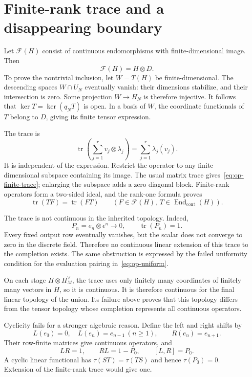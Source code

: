 \section{Finite-rank trace and a disappearing boundary}

Let $\mathcal F(H)$ consist of continuous endomorphisms with
finite-dimensional image. Then
\[
 \mathcal F(H)=H\otimes D.
\]
To prove the nontrivial inclusion, let $W=T(H)$ be finite-dimensional.
The descending spaces $W\cap U_N$ eventually vanish: their dimensions
stabilize, and their intersection is zero. Some projection $W\to H_N$
is therefore injective. It follows that
$\ker T=\ker(q_NT)$ is open. In a basis of $W$, the coordinate
functionals of $T$ belong to $D$, giving its finite tensor expression.

The trace is
\begin{equation}
 \operatorname{tr}\!\left(\sum_{j=1}^r v_j\otimes\lambda_j\right)
       =\sum_{j=1}^r\lambda_j(v_j).
 \label{eq:op-finite-trace}
\end{equation}
It is independent of the expression. Restrict the operator to any
finite-dimensional subspace containing its image. The usual matrix trace
gives~\eqref{eq:op-finite-trace}; enlarging the subspace adds a zero
diagonal block. Finite-rank operators form a two-sided ideal, and the
rank-one formula proves
\[
 \operatorname{tr}(TF)=\operatorname{tr}(FT)
 \qquad(F\in\mathcal F(H),\ T\in\operatorname{End}_{\mathrm{cont}}(H)).
\]

The trace is not continuous in the inherited topology. Indeed,
\[
 P_n=e_n\otimes\epsilon^n\longrightarrow0,
 \qquad\operatorname{tr}(P_n)=1.
\]
Every fixed output row eventually vanishes, but the scalar does not
converge to zero in the discrete field. Therefore no continuous linear
extension of this trace to the completion exists. The same obstruction
is expressed by the failed uniformity condition for the evaluation
pairing in~\eqref{eq:op-uniform}.

On each stage $H\otimes H_M^\vee$, the trace uses only finitely
many coordinates of finitely many vectors in $H$, so it is continuous.
It is therefore continuous for the final linear topology of the union.
Its failure above proves that this topology differs from the tensor
topology whose completion represents all continuous operators.

Cyclicity fails for a stronger algebraic reason. Define the left and
right shifts by
\[
 L(e_0)=0,\quad L(e_n)=e_{n-1}\ (n\geq1),\qquad R(e_n)=e_{n+1}.
\]
Their row-finite matrices give continuous operators, and
\begin{equation}
 LR=1,\qquad RL=1-P_0,\qquad[L,R]=P_0.
 \label{eq:op-shift}
\end{equation}
A cyclic linear functional has $\tau(ST)=\tau(TS)$ and hence
$\tau(P_0)=0$. Extension of the finite-rank trace would give one.

